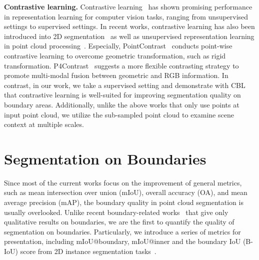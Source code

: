 \documentclass[10pt,twocolumn,letterpaper]{article}
\begin{document}
\noindent\textbf{Contrastive learning.}
Contrastive learning~\cite{infonce, softnn, supcon, others_regioncl, moco, cont_simple} has shown promising performance in representation learning for computer vision tasks, ranging from unsupervised settings to supervised settings. In recent works, 
contrastive learning has also been introduced into 2D segmentation~\cite{imgcl_dense, imgcl_glb} as well as unsupervised representation learning in point cloud processing~\cite{pointcontrast, p4contrast, contrastscene}.
Especially, PointContrast~\cite{pointcontrast} conducts point-wise contrastive learning to overcome geometric transformation, such as rigid transformation. 
P4Contrast~\cite{p4contrast} suggests a more flexible contrasting strategy to promote multi-modal fusion between geometric and RGB information. In contrast, in our work, we take a supervised setting and demonstrate with CBL that contrastive learning is well-suited for improving segmentation quality on boundary areas. Additionally, unlike the above works that only use points at input point cloud, we utilize the sub-sampled point cloud to examine scene context at multiple scales.

\section{Segmentation on Boundaries}
\label{sec:metric}

Since most of the current works focus on the improvement of general metrics, such as mean intersection over union (mIoU), overall accuracy (OA), and mean average precision (mAP), the boundary quality in point cloud segmentation is usually overlooked. Unlike recent boundary-related works~\cite{bound_3d_pred,bound_3d_jse} that give only qualitative results on boundaries, we are the first to quantify the quality of segmentation on boundaries. Particularly, we introduce a series of metrics for presentation, including mIoU@boundary, mIoU@inner and the boundary IoU (B-IoU) score from 2D instance segmentation tasks~\cite{bound_iou}.
\end{document}
